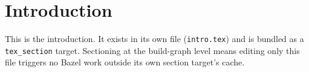 \section{Introduction}
\label{sec:intro}

This is the introduction. It exists in its own file
(\texttt{intro.tex}) and is bundled as a \texttt{tex\_section}
target. Sectioning at the build-graph level means editing only
this file triggers no Bazel work outside its own section
target's cache.
